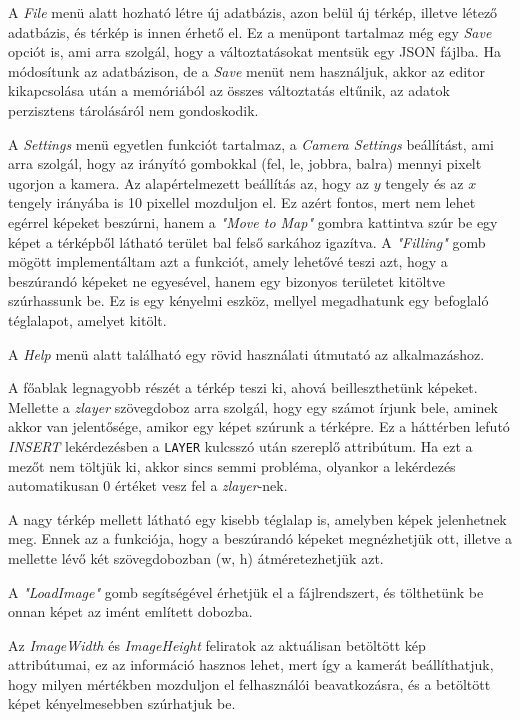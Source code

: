 A \textit{File} menü alatt hozható létre új adatbázis, azon belül új térkép, illetve létező adatbázis, és térkép is innen érhető el. Ez a menüpont tartalmaz még egy \textit{Save} opciót is, ami arra szolgál, hogy a változtatásokat mentsük egy JSON fájlba. Ha módosítunk az adatbázison, de a \textit{Save} menüt nem használjuk, akkor az editor kikapcsolása után a memóriából az összes változtatás eltűnik, az adatok perzisztens tárolásáról nem gondoskodik.

A \textit{Settings} menü egyetlen funkciót tartalmaz, a \textit{Camera Settings} beállítást, ami arra szolgál, hogy az irányító gombokkal (fel, le, jobbra, balra) mennyi pixelt ugorjon a kamera. Az alapértelmezett beállítás az, hogy az $y$ tengely és az $x$ tengely irányába is 10 pixellel mozduljon el.
Ez azért fontos, mert nem lehet egérrel képeket beszúrni, hanem a \textit{"Move to Map"} gombra kattintva szúr be egy képet a térképből látható terület bal felső sarkához igazítva. 
A \textit{"Filling"} gomb mögött implementáltam azt a funkciót, amely lehetővé teszi azt, hogy a beszúrandó képeket ne egyesével, hanem egy bizonyos területet kitöltve szúrhassunk be. Ez is egy kényelmi eszköz, mellyel megadhatunk egy befoglaló téglalapot, amelyet kitölt.

A \textit{Help} menü alatt található egy rövid használati útmutató az alkalmazáshoz.

A főablak legnagyobb részét a térkép teszi ki, ahová beilleszthetünk képeket. Mellette a \textit{zlayer} szövegdoboz arra szolgál, hogy egy számot írjunk bele, aminek akkor van jelentősége, amikor egy képet szúrunk a térképre. Ez a háttérben lefutó \textit{INSERT} lekérdezésben a \texttt{LAYER} kulcsszó után szereplő attribútum. Ha ezt a mezőt nem töltjük ki, akkor sincs semmi probléma, olyankor a lekérdezés automatikusan 0 értéket vesz fel a \textit{zlayer}-nek.

A nagy térkép mellett látható egy kisebb téglalap is, amelyben képek jelenhetnek meg. Ennek az a funkciója, hogy a beszúrandó képeket megnézhetjük ott, illetve a mellette lévő két szövegdobozban (w, h) átméretezhetjük azt. 

A \textit{"LoadImage"} gomb segítségével érhetjük el a fájlrendszert, és tölthetünk be onnan képet az imént említett dobozba.

Az \textit{ImageWidth} és \textit{ImageHeight} feliratok az aktuálisan betöltött kép attribútumai, ez az információ hasznos lehet, mert így a kamerát beállíthatjuk, hogy milyen mértékben mozduljon el felhasználói beavatkozásra, és a betöltött képet kényelmesebben szúrhatjuk be.

